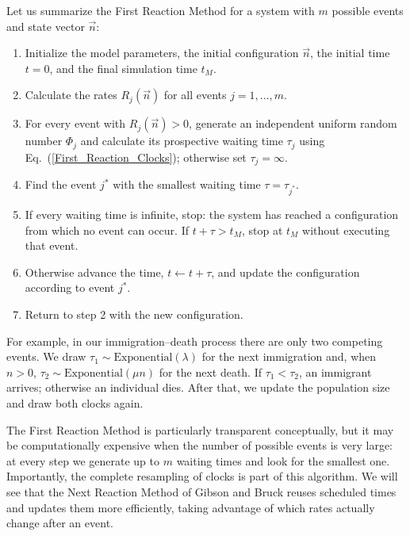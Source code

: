 Let us summarize the First Reaction Method for a system with $m$ possible events and state vector $\vec n$:
\begin{enumerate}
 \item Initialize the model parameters, the initial configuration $\vec n$, the initial time $t=0$, and the final simulation time $t_M$.
 \item Calculate the rates $R_j(\vec n)$ for all events $j=1,\ldots,m$.
 \item For every event with $R_j(\vec n)>0$, generate an independent uniform random number $\Phi_j$ and calculate its prospective waiting time $\tau_j$ using Eq.~(\ref{First_Reaction_Clocks}); otherwise set $\tau_j=\infty$.
 \item Find the event $j^*$ with the smallest waiting time $\tau=\tau_{j^*}$.
 \item If every waiting time is infinite, stop: the system has reached a configuration from which no event can occur. If $t+\tau>t_M$, stop at $t_M$ without executing that event.
 \item Otherwise advance the time, $t\leftarrow t+\tau$, and update the configuration according to event $j^*$.
 \item Return to step 2 with the new configuration.
\end{enumerate}

For example, in our immigration--death process there are only two competing events. We draw $\tau_1\sim\mathrm{Exponential}(\lambda)$ for the next immigration and, when $n>0$, $\tau_2\sim\mathrm{Exponential}(\mu n)$ for the next death. If $\tau_1<\tau_2$, an immigrant arrives; otherwise an individual dies. After that, we update the population size and draw both clocks again.
\smallskip

The First Reaction Method is particularly transparent conceptually, but it may be computationally expensive when the number of possible events is very large: at every step we generate up to $m$ waiting times and look for the smallest one. Importantly, the complete resampling of clocks is part of this algorithm. We will see that the Next Reaction Method of Gibson and Bruck \cite{Gibson00}reuses scheduled times and updates them more efficiently, taking advantage of which rates actually change after an event.

